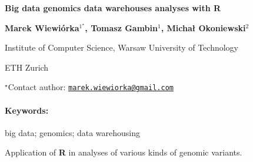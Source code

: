\documentclass[11pt, a4paper]{article}
\renewcommand{\title}[1]{\begin{center}{\bf \LARGE #1}\end{center}}
\newcommand{\keywords}{\paragraph{Keywords:}}
\begin{document}
\pagestyle{empty}

\title{Big data genomics data warehouses analyses with R}

\begin{center}
  {\bf Marek Wiewiórka$^{1^\star}$, Tomasz Gambin$^{1}$, Michał Okoniewski$^{2}$}
\end{center}

\vskip 0.3cm

\begin{affiliations}
\begin{enumerate}
\begin{minipage}{0.915\textwidth}
\centering
\item Institute of Computer Science, Warsaw University of Technology \\[-2pt]
\item ETH Zurich \\[-2pt]
\end{minipage}
\end{enumerate}
$^\star$Contact author: \href{mailto:marek.wiewiorka@gmail.com}{\nolinkurl{marek.wiewiorka@gmail.com}}\\
\end{affiliations}

\vskip 0.5cm

\begin{minipage}{0.915\textwidth}
\keywords big data; genomics; data warehousing
\end{minipage}

\vskip 0.8cm

Application of \textbf{R} in analyses of various kinds of genomic
variants.
\end{document}
